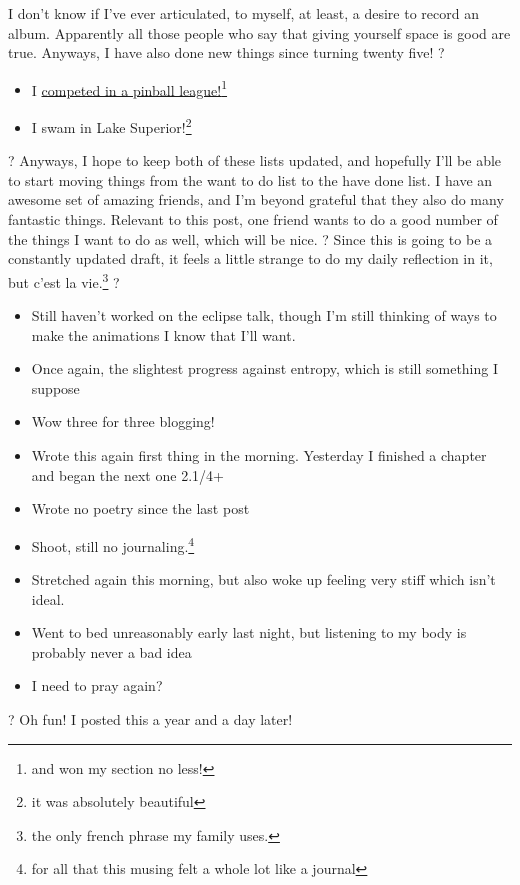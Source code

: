 \documentclass[12pt]{article}[titlepage]
\newcommand{\1}{\={a}}
\newcommand{\2}{\={e}}
\newcommand{\3}{\={\i}}
\newcommand{\4}{\=o}
\newcommand{\5}{\=u}
\newcommand{\6}{\={A}}
\renewcommand{\,}{\textsuperscript{,}}
\begin{document}
I don't know if I've ever articulated, to myself, at least, a desire to record an album.
Apparently all those people who say that giving yourself space is good are true.
Anyways, I have also done new things since turning twenty five!
?
\begin{itemize}
\item I \href{pinball.html}{competed in a pinball league!}\footnote{and won my section no less!}
\item I swam in Lake Superior!\footnote{it was absolutely beautiful}
\end{itemize}
?
Anyways, I hope to keep both of these lists updated, and hopefully I'll be able to start moving things from the want to do list to the have done list.
I have an awesome set of amazing friends, and I'm beyond grateful that they also do many fantastic things.
Relevant to this post, one friend wants to do a good number of the things I want to do as well, which will be nice.
?
Since this is going to be a constantly updated draft, it feels a little strange to do my daily reflection in it, but c'est la vie.\footnote{the only french phrase my family uses.}
?
\begin{itemize}
\item Still haven't worked on the eclipse talk, though I'm still thinking of ways to make the animations I know that I'll want.
\item Once again, the slightest progress against entropy, which is still something I suppose
\item Wow three for three blogging!
\item Wrote this again first thing in the morning. Yesterday I finished a chapter and began the next one 2.1/4+
\item Wrote no poetry since the last post
\item Shoot, still no journaling.\footnote{for all that this musing felt a whole lot like a journal}
\item Stretched again this morning, but also woke up feeling very stiff which isn't ideal.
\item Went to bed unreasonably early last night, but listening to my body is probably never a bad idea
\item I need to pray again?\end{itemize}?
Oh fun! I posted this a year and a day later!
\end{document}
